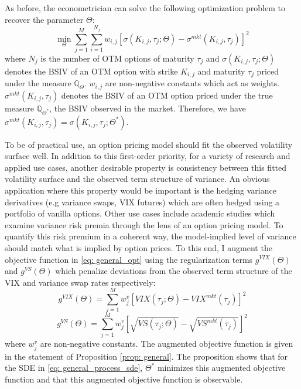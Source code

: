 \documentclass[12pt]{article}
\begin{document}
As before, the econometrician can solve the following optimization problem to recover the parameter $\Theta$:
\begin{equation}\label{eq: general_opt}
    \min\limits_{\Theta} \sum\limits_{j=1}^M\sum\limits_{i=1}^{N_j} w_{i,j} \left[\sigma(K_{i,j}, \tau_j; \Theta) - \sigma^{mkt}(K_{i,j}, \tau_j)\right]^2 
\end{equation}
where $N_j$ is the number of OTM options of maturity $\tau_j$ and $\sigma(K_{i,j}, \tau_j; \Theta)$ denotes the BSIV of an OTM option with strike $K_{i,j}$ and maturity $\tau_j$ priced under the measure $\mathbb{Q}_{\Theta}$. $w_{i,j}$ are non-negative constants which act as weights. $\sigma^{mkt}(K_{i,j}, \tau_j)$ denotes the BSIV of an OTM option priced under the true measure $\mathbb{Q}_{\Theta^*}$, the BSIV observed in the market. Therefore, we have $\sigma^{mkt}(K_{i,j}, \tau_j) = \sigma(K_{i,j}, \tau_j; \Theta^*)$.

To be of practical use, an option pricing model should fit the observed volatility surface well. In addition to this first-order priority, for a variety of research and applied use cases, another desirable property is consistency between this fitted volatility surface and the observed term structure of variance. An obvious application where this property would be important is the hedging variance derivatives (e.g variance swaps, VIX futures) which are often hedged using a portfolio of vanilla options. Other use cases include academic studies which examine variance risk premia through the lens of an option pricing model. To quantify this risk premium in a coherent way, the model-implied level of variance should match what is implied by option prices. To this end, I augment the objective function in \eqref{eq: general_opt} using the regularization terms $g^{VIX}(\Theta)$ and $g^{VS}(\Theta)$ which penalize deviations from the observed term structure of the VIX and variance swap rates respectively:
\begin{equation}\label{eq: reg_term_VIX}
    g^{VIX}(\Theta) = \sum\limits_{j=1}^{M} w^v_j \left[VIX(\tau_j; \Theta) - VIX^{mkt}(\tau_j)\right]^2
\end{equation}
\begin{equation}\label{eq: reg_term_VS}
g^{VS}(\Theta) = \sum\limits_{j=1}^{M} w^v_j \left[\sqrt{VS(\tau_j; \Theta)} - \sqrt{VS^{mkt}(\tau_j)}\right]^2 
\end{equation}
where $w^v_j$ are non-negative constants. The augmented objective function is given in the statement of Proposition \ref{prop: general}. The proposition shows that for the SDE in \eqref{eq: general_process_sde}, $\Theta^*$ minimizes this augmented objective function and that this augmented objective function is observable. 
\end{document}
